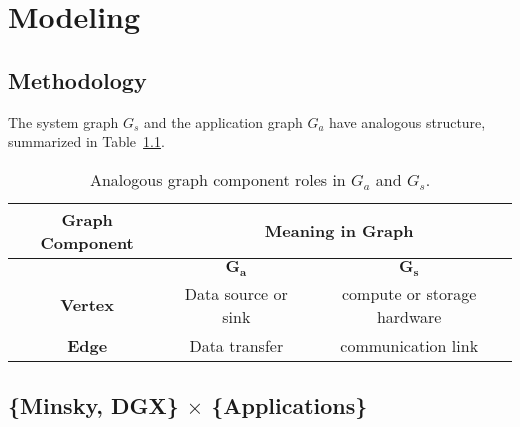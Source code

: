 \chapter{Modeling}
\label{ch:modeling}

\section{Methodology}

The system graph $G_s$ and the application graph $G_a$ have analogous structure, summarized in Table~\ref{tab:graph-comparison}.

\begin{table}[h]
    \centering
    \caption{Analogous graph component roles in $G_a$ and $G_s$.}
    \label{tab:graph-comparison}
    \begin{tabular}{|c|c|c|}
    \hline
    \textbf{Graph Component} & \multicolumn{2}{|c|}{\textbf{Meaning in Graph}}   \\ \hline
                             & $\bm{G_a}$    & $\bm{G_s}$                        \\ \hline \hline
    \textbf{Vertex}          & Data source or sink & compute or storage hardware \\ \hline
    \textbf{Edge}            & Data transfer & communication link                \\ \hline
    \end{tabular}
\end{table}



\section{\{Minsky, DGX\} $\times$ \{Applications\}}